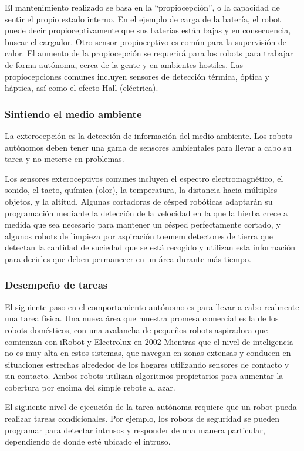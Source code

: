 El mantenimiento realizado se basa en la ``propiocepción'', o la capacidad de sentir el propio estado interno. En el ejemplo de carga de la batería, el robot puede decir propioceptivamente que sus baterías están bajas y en consecuencia, buscar el cargador. Otro sensor propioceptivo es común para la supervisión de calor. El aumento de la propiocepción se requerirá para los robots para trabajar de forma autónoma, cerca de la gente y en ambientes hostiles. Las propiocepciones comunes incluyen sensores de detección térmica, óptica y háptica, así como el efecto Hall (eléctrica).

\subsubsection{Sintiendo el medio ambiente}
La exterocepción es la detección de información del medio ambiente. Los robots autónomos deben tener una gama de sensores ambientales para llevar a cabo su tarea y no meterse en problemas.

Los sensores exteroceptivos comunes incluyen el espectro electromagnético, el sonido, el tacto, química (olor), la temperatura, la distancia hacia múltiples objetos, y la altitud.
Algunas cortadoras de césped robóticas adaptarán su programación mediante la detección de la velocidad en la que la hierba crece a medida que sea necesario para mantener un césped perfectamente cortado, y algunos robots de limpieza por aspiración toemem detectores de tierra que detectan la cantidad de suciedad que se está recogido y utilizan esta información para decirles que deben permanecer en un área durante más tiempo.

\subsubsection{Desempeño de tareas}
El siguiente paso en el comportamiento autónomo es para llevar a cabo realmente una tarea física. Una nueva área que muestra promesa comercial es la de los robots domésticos, con una avalancha de pequeños robots aspiradora que comienzan con iRobot y Electrolux en 2002 Mientras que el nivel de inteligencia no es muy alta en estos sistemas, que navegan en zonas extensas y conducen en situaciones estrechas alrededor de los hogares utilizando sensores de contacto y sin contacto. Ambos robots utilizan algoritmos propietarios para aumentar la cobertura por encima del simple rebote al azar.

El siguiente nivel de ejecución de la tarea autónoma requiere que un robot pueda realizar tareas condicionales. Por ejemplo, los robots de seguridad se pueden programar para detectar intrusos y responder de una manera particular, dependiendo de donde esté ubicado el intruso.

